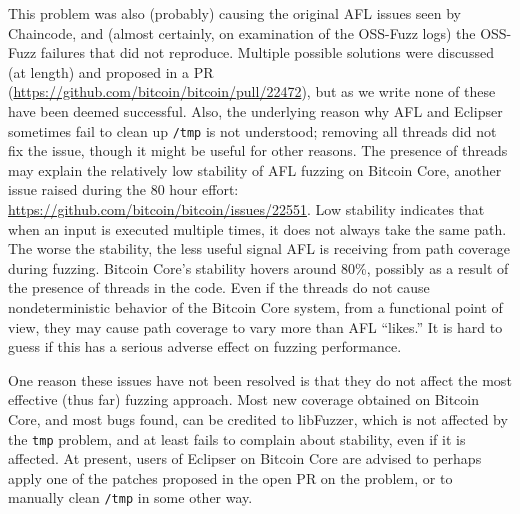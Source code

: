 This problem was also (probably) causing the original AFL issues seen
by Chaincode, and (almost certainly, on examination of  the OSS-Fuzz
logs) the OSS-Fuzz failures that did not reproduce.  Multiple possible
solutions were discussed (at length) and proposed in a PR
(\url{https://github.com/bitcoin/bitcoin/pull/22472}), but as we write
none of these have been deemed successful.  Also, the underlying
reason why AFL and Eclipser sometimes fail to clean up {\tt /tmp} is
not understood; removing all threads did not fix the issue, though it
might be useful for other reasons.  The presence of threads may
explain the relatively low stability of AFL fuzzing on Bitcoin Core,
another issue raised during the 80 hour effort:
\url{https://github.com/bitcoin/bitcoin/issues/22551}.  Low stability
indicates that when an input is executed multiple times, it does not
always take the same path.  The worse the stability, the less useful signal
AFL is receiving from path coverage during fuzzing.  Bitcoin Core's
stability hovers around 80\%, possibly as a result of the presence of
threads in the code.  Even if the threads do not cause nondeterministic
behavior of the Bitcoin Core system, from a functional point of view,
they may cause path coverage to vary more than AFL ``likes.''  It is
hard to guess if this has a serious adverse effect on fuzzing
performance.

One reason these issues have not been resolved is that they do not
affect the most effective (thus far) fuzzing approach.  Most new
coverage obtained on Bitcoin Core, and most bugs found, can be
credited to libFuzzer, which is not affected by the {\tt tmp} problem,
and at least fails to complain about stability, even if it is
affected.  At present, users of Eclipser on Bitcoin Core are advised
to perhaps apply one of the patches proposed in the open PR on the
problem, or to manually clean {\tt /tmp} in some other way.